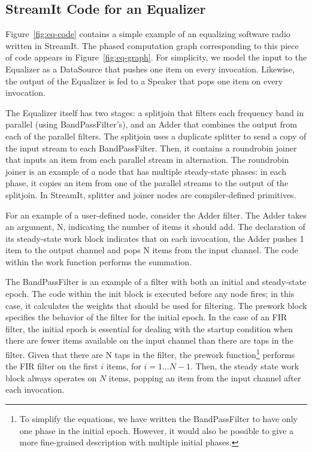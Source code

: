 \subsection{StreamIt Code for an Equalizer}

Figure~\ref{fig:eq-code} contains a simple example of an equalizing
software radio written in StreamIt.  The phased computation graph
corresponding to this piece of code appears in
Figure~\ref{fig:eq-graph}.  For simplicity, we model the input to the
Equalizer as a DataSource that pushes one item on every invocation.
Likewise, the output of the Equalizer is fed to a Speaker that pops
one item on every invocation.  

The Equalizer itself has two stages: a splitjoin that filters each
frequency band in parallel (using BandPassFilter's), and an Adder that
combines the output from each of the parallel filters.  The splitjoin
uses a duplicate splitter to send a copy of the input stream to each
BandPassFilter.  Then, it contains a roundrobin joiner that inputs an
item from each parallel stream in alternation.  The roundrobin joiner
is an example of a node that has multiple steady-state phases: in each
phase, it copies an item from one of the parallel streams to the
output of the splitjoin.  In StreamIt, splitter and joiner nodes are
compiler-defined primitives.

For an example of a user-defined node, consider the Adder filter.  The
Adder takes an argument, N, indicating the number of items it should
add.  The declaration of its steady-state work block indicates that on
each invocation, the Adder pushes 1 item to the output channel and
pops N items from the input channel.  The code within the work
function performs the summation.

The BandPassFilter is an example of a filter with both an initial and
steady-state epoch.  The code within the init block is executed before
any node fires; in this case, it calculates the weights that should be
used for filtering.  The prework block specifies the behavior of the
filter for the initial epoch.  In the case of an FIR filter, the
initial epoch is essential for dealing with the startup condition when
there are fewer items available on the input channel than there are
taps in the filter.  Given that there are N taps in the filter, the
prework function\footnote{To simplify the equations, we have written
the BandPassFilter to have only one phase in the initial epoch.
However, it would also be possible to give a more fine-grained
description with multiple initial phases.} performs the FIR filter on
the first $i$ items, for $i = 1 \dots N-1$.  Then, the steady state
work block always operates on $N$ items, popping an item from the
input channel after each invocation.


